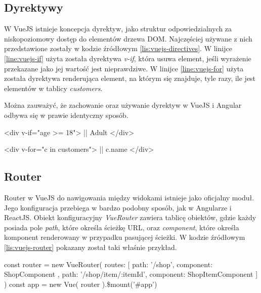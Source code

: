 	\subsection{Dyrektywy}
	W VueJS istnieje koncepcja dyrektyw, jako struktur odpowiedzialnych za niskopoziomowy dostęp do elementów drzewa DOM. Najczęściej używane z nich przedstawione zostały w kodzie źródłowym \ref{lis:vuejs-directives}. W linijce \ref{line:vuejs-if} użyta została dyrektywa \textit{v-if}, która usuwa element, jeśli wyrażenie przekazane jako jej wartość jest nieprawdziwe. W linijce \ref{line:vuejs-for} użyta została dyrektywa renderująca element, na którym się znajduje, tyle razy, ile jest elementów w tablicy \textit{customers}.\par
	Można zauważyć, że zachowanie oraz używanie dyrektyw w VueJS i Angular odbywa się w prawie identyczny sposób.
	
	\begin{code}[
		language=javascript,
		caption={Używanie dyrektyw w VueJS (źródło: opracowanie własne)},
		label={lis:vuejs-directives},
		escapechar=|
	]
<div v-if="age >= 18"> |\label{line:vuejs-if}|
  Adult
</div>

<div v-for="c in customers"> |\label{line:vuejs-for}|
  {{c.name}}
</div>
	\end{code}

	\subsection{Router}
	Router w VueJS do nawigowania między widokami istnieje jako oficjalny moduł. Jego konfiguracja przebiega w bardzo podobny sposób, jak w Angularze i ReactJS. Obiekt konfiguracyjny \textit{VueRouter} zawiera tablicę obiektów, gdzie każdy posiada pole \textit{path}, które określa ścieżkę URL, oraz \textit{component}, które określa komponent renderowany w przypadku pasującej ścieżki. W kodzie źródłowym \ref{lis:vuejs-router} pokazany został taki właśnie przykład.
	
	\begin{code}[
		language=javascript,
		caption={Konfiguracja Routera w VueJS (źródło: opracowanie własne)},
		label={lis:vuejs-router},
		escapechar=|
	]
const router = new VueRouter({
  routes: [
    { path: '/shop', component: ShopComponent },
    { path: '/shop/item/:itemId', component: ShopItemComponent }
  ]
})
const app = new Vue({
  router
}).\$mount('#app')
	\end{code}
	
	
	
	
	
	
	
	
	
	
	
	
	
	
	
	
	